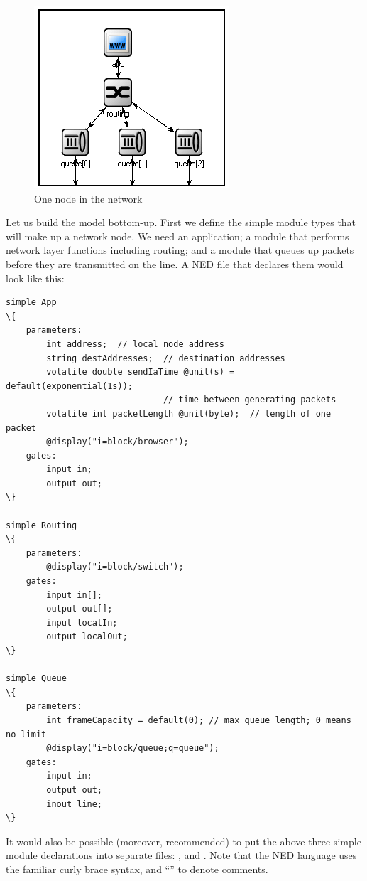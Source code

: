 \begin{figure}[htbp]
  \begin{center}
    \includegraphics[scale=0.6]{figures/ned-routing-node}
    \caption{One node in the network}
    \label{fig:ned-routing-node}
  \end{center}
\end{figure}

Let us build the model bottom-up. First we define the simple module
types that will make up a network node. We need an application;
a module that performs network layer functions including routing;
and a module that queues up packets before they are transmitted on the
line. A NED file that declares them would look like this:

\begin{Verbatim}[commandchars=\\\{\}]
simple App
\{
    parameters:
        int address;  // local node address
        string destAddresses;  // destination addresses
        volatile double sendIaTime @unit(s) = default(exponential(1s));
                               // time between generating packets
        volatile int packetLength @unit(byte);  // length of one packet
        @display("i=block/browser");
    gates:
        input in;
        output out;
\}

simple Routing
\{
    parameters:
        @display("i=block/switch");
    gates:
        input in[];
        output out[];
        input localIn;
        output localOut;
\}

simple Queue
\{
    parameters:
        int frameCapacity = default(0); // max queue length; 0 means no limit
        @display("i=block/queue;q=queue");
    gates:
        input in;
        output out;
        inout line;
\}
\end{Verbatim}

It would also be possible (moreover, recommended) to put the above three
simple module declarations into separate  files: ,
 and . Note that the NED language uses
the familiar curly brace syntax, and ``\ttt{//}'' to denote comments.

